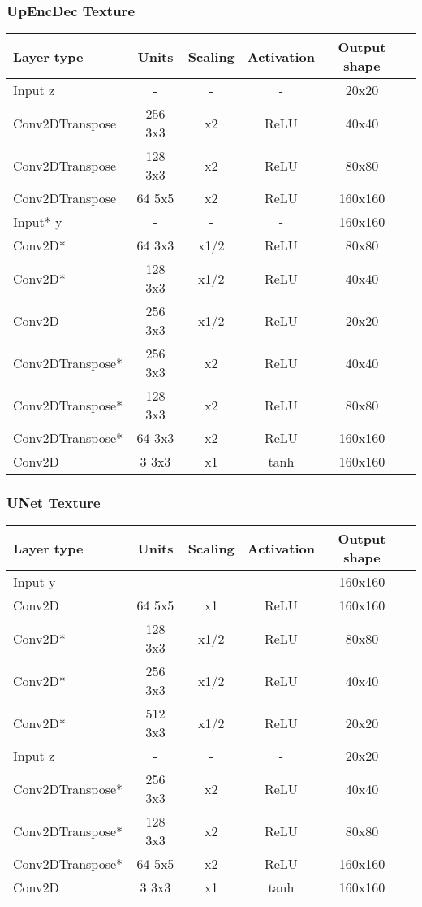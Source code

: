 {\subsubsection{UpEncDec Texture}
{
	\centering
	\begin{tabular}{|l|c|c|c|c|c|}
		\hline
		Layer type & Units & Scaling & Activation & Output shape\\
		\hline
		Input z & - & - & - & 20x20 \\
		Conv2DTranspose & 256 3x3 & x2 & ReLU & 40x40 \\
		Conv2DTranspose & 128 3x3 & x2 & ReLU & 80x80 \\
		Conv2DTranspose & 64 5x5 & x2 & ReLU & 160x160 \\
		Input* y & - & - & - & 160x160\\
		Conv2D* & 64 3x3 & x1/2 & ReLU & 80x80 \\
		Conv2D* & 128 3x3 & x1/2 & ReLU & 40x40 \\
		Conv2D & 256 3x3 & x1/2 & ReLU & 20x20 \\
		Conv2DTranspose* & 256 3x3 & x2 & ReLU & 40x40 \\
		Conv2DTranspose* & 128 3x3 & x2 & ReLU & 80x80 \\
		Conv2DTranspose* & 64 3x3 & x2 & ReLU & 160x160 \\
		Conv2D & 3 3x3 & x1 & tanh & 160x160 \\
		\hline
	\end{tabular}
}

\subsubsection{UNet Texture}
{
	\centering
	\begin{tabular}{|l|c|c|c|c|c|}
		\hline
		Layer type & Units & Scaling & Activation & Output shape\\
		\hline
		Input y & - & - & - & 160x160\\
		Conv2D & 64 5x5 & x1 & ReLU & 160x160 \\
		Conv2D* & 128 3x3 & x1/2 & ReLU & 80x80 \\
		Conv2D* & 256 3x3 & x1/2 & ReLU & 40x40 \\
		Conv2D* & 512 3x3 & x1/2 & ReLU & 20x20 \\
		Input z & - & - & - & 20x20 \\
		Conv2DTranspose* & 256 3x3 & x2 & ReLU & 40x40 \\
		Conv2DTranspose* & 128 3x3 & x2 & ReLU & 80x80 \\
		Conv2DTranspose* & 64 5x5 & x2 & ReLU & 160x160 \\
		Conv2D & 3 3x3 & x1 & tanh & 160x160 \\
		\hline
	\end{tabular}
}

}
